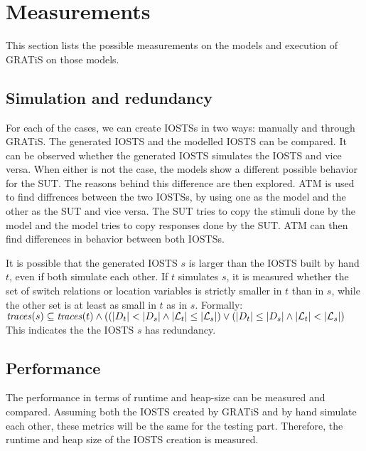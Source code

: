 \section{Measurements}\label{sec:measurements}

This section lists the possible measurements on the models and execution of GRATiS on those models.

\subsection{Simulation and redundancy}
For each of the cases, we can create IOSTSs in two ways: manually and through GRATiS. The generated IOSTS and the modelled IOSTS can be compared. It can be observed whether the generated IOSTS simulates the IOSTS and vice versa. When either is not the case, the models show a different possible behavior for the SUT. The reasons behind this difference are then explored. ATM is used to find diffrences between the two IOSTSs, by using one as the model and the other as the SUT and vice versa. The SUT tries to copy the stimuli done by the model and the model tries to copy responses done by the SUT. ATM can then find differences in behavior between both IOSTSs.

It is possible that the generated IOSTS $s$ is larger than the IOSTS built by hand $t$, even if both simulate each other. If $t$ simulates $s$, it is measured whether the set of switch relations or location variables is strictly smaller in $t$ than in $s$, while the other set is at least as small in $t$ as in $s$. Formally:
\vspace{5px} \\
$\mathit{traces}(s) \subseteq \mathit{traces}(t) \land ((|D_t| < |D_s| \land |\mathcal{L}_t| \leq |\mathcal{L}_s|) \lor (|D_t| \leq |D_s| \land |\mathcal{L}_t| < |\mathcal{L}_s|)$
\vspace{5px} \\
This indicates the the IOSTS $s$ has redundancy.

\subsection{Performance}
The performance in terms of runtime and heap-size can be measured and compared. Assuming both the IOSTS created by GRATiS and by hand simulate each other, these metrics will be the same for the testing part. Therefore, the runtime and heap size of the IOSTS creation is measured.

